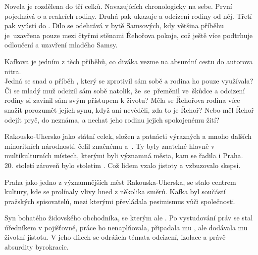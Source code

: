 \documentclass{extarticle} %
\begin{document}
\noindent Novela je rozdělena do tří celků.
Navazujících chronologicky na sebe.
První pojednává o  a reakcích rodiny.
Druhá pak ukazuje  a odcizení rodiny od něj.
Třetí pak vyústí do .
Dílo se odehrává v bytě Samsových,
kdy většina příběhu je~uzavřena pouze mezi čtyřmi stěnami Řehořova pokoje,
což ještě více podtrhuje odloučení a uzavření mladého Samsy.

\noindent Kafkova  je jedním z těch příběhů,
co diváka vezme na absurdní cestu do autorova nitra. \\
Jedná se snad o příběh , který se zprotivil sám sobě
a rodina ho pouze využívala?
Či se mladý muž odcizil sám sobě natolik, že~se~přeměnil ve~škůdce
a odcizení rodiny si zavinil sám svým přístupem k životu?
Měla se Řehořova rodina více snažit porozumět jejich synu,
když ani nevěděli, zda to je Řehoř?
Nebo měl Řehoř odejít pryč, do neznáma, a nechat jeho rodinu jejich spokojenému žití?


\noindent Rakousko-Uhersko jako státní celek,
složen z patnácti výrazných a mnoho dalších minoritních národností,
čelil značnému  a~.
Ty byly znatelné hlavně v multikulturních místech, kterými byli významná města, kam se řadila i Praha.
20. století zároveň bylo stoletím .
Což lidem vzalo jistoty a vzbuzovalo skepsi.

\noindent Praha jako jedno z významnějších měst Rakouska-Uherska, se stalo centrem kultury,
kde se prolínaly vlivy hned z několika směrů.
Kafka byl součástí pražských spisovatelů, mezi kterými převládala pesimismus vůči společnosti.



\noindent Syn bohatého židovského obchodníka, se kterým ale .
Po vystudování práv se stal úředníkem v pojišťovně, práce ho nenaplňovala,
připadala mu , ale dodávala mu životní jistotu.
V jeho dílech se odrážela témata odcizení, izolace a právě absurdity byrokracie.
\end{document}
